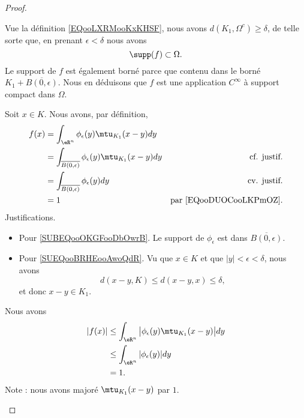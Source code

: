 \begin{proof}
\begin{subproof}
		Vue la définition \ref{EQooLXRMooKxKHSF}, nous avons \( d(K_1,\Omega^c)\geq \delta\), de telle sorte que, en prenant \( \epsilon<\delta\) nous avons
		\begin{equation}
			\supp(f)\subset \Omega.
		\end{equation}
		Le support de \( f\) est également borné parce que contenu dans le borné \( K_1+\overline{B(0,\epsilon)}\). Nous en déduisons que \( f\) est une application \( C^{\infty}\) à support compact dans \( \Omega\).

		\spitem[\( f(x)\) si \( x\in K\)]
		Soit \( x\in K\). Nous avons, par définition,
		\begin{subequations}
			\begin{align}
				f(x) & =\int_{\eR^n}\phi_{\epsilon}(y)\mtu_{K_1}(x-y)dy                                                                     \\
				     & =\int_{\overline{B(0,\epsilon)}}\phi_{\epsilon}(y)\mtu_{K_1}(x-y)dy & \text{cf. justif.} \label{SUBEQooOKGFooDbOwrB} \\
				     & =\int_{\overline{B(0,\epsilon)}}\phi_{\epsilon}(y)dy                & \text{cv. justif.}		\label{SUEQooBRHEooAwoQdR}   \\
				     & = 1                                                                 & \text{par \eqref{EQooDUOCooLKPmOZ}}.
			\end{align}
		\end{subequations}
		Justifications.
		\begin{itemize}
			\item
			      Pour \ref{SUBEQooOKGFooDbOwrB}. Le support de \( \phi_{\epsilon}\) est dans \( \overline{B(0,\epsilon)}\).
			\item
			      Pour \ref{SUEQooBRHEooAwoQdR}. Vu que \( x\in K\) et que \( | y |<\epsilon<\delta\), nous avons
			      \begin{equation}
				      d(x-y,K)\leq d(x-y,x)\leq \delta,
			      \end{equation}
			      et donc \( x-y\in K_1\).
		\end{itemize}
		Nous avons
		\begin{subequations}
			\begin{align}
				| f(x) | & \leq \int_{\eR^n}\big| \phi_{\epsilon}(y)\mtu_{K_1}(x-y) \big|dy \\
				         & \leq \int_{\eR^n}| \phi_{\epsilon}(y) |dy                        \\
				         & =1.
			\end{align}
		\end{subequations}
		Note : nous avons majoré \( \mtu_{K_1}(x-y)\) par \( 1\).
	\end{subproof}
\end{proof}

